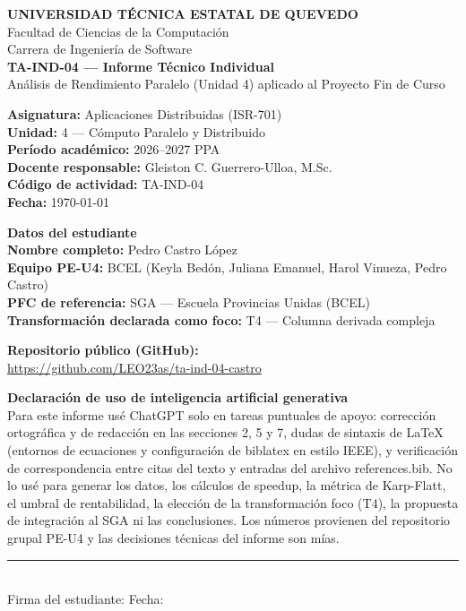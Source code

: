 \documentclass[11pt,a4paper]{article}
\begin{document}
\begin{center}
{\large\textbf{UNIVERSIDAD TÉCNICA ESTATAL DE QUEVEDO}} \\[2pt]
Facultad de Ciencias de la Computación \\
Carrera de Ingeniería de Software \\[10pt]

{\large\textbf{TA-IND-04 --- Informe Técnico Individual}} \\[4pt]
Análisis de Rendimiento Paralelo (Unidad 4) aplicado al Proyecto Fin de Curso \\[8pt]
\end{center}

\vspace{4pt}
\noindent\textbf{Asignatura:} Aplicaciones Distribuidas (ISR-701) \\
\textbf{Unidad:} 4 --- Cómputo Paralelo y Distribuido \\
\textbf{Período académico:} 2026--2027 PPA \\
\textbf{Docente responsable:} Gleiston C. Guerrero-Ulloa, M.Sc. \\
\textbf{Código de actividad:} TA-IND-04 \\
\textbf{Fecha:} \today

\vspace{10pt}
\noindent\textbf{Datos del estudiante} \\[4pt]
\textbf{Nombre completo:} Pedro Castro López \\
\textbf{Equipo PE-U4:} BCEL (Keyla Bedón, Juliana Emanuel, Harol Vinueza, Pedro Castro) \\
\textbf{PFC de referencia:} SGA --- Escuela Provincias Unidas (BCEL) \\
\textbf{Transformación declarada como foco:} T4 --- Columna derivada compleja

\vspace{10pt}
\noindent\textbf{Repositorio público (GitHub):} \\[4pt]
\url{https://github.com/LEO23as/ta-ind-04-castro}

\vspace{10pt}
\noindent\textbf{Declaración de uso de inteligencia artificial generativa} \\[4pt]
Para este informe usé ChatGPT solo en tareas puntuales de apoyo: corrección ortográfica y de redacción en las secciones 2, 5 y 7, dudas de sintaxis de LaTeX (entornos de ecuaciones y configuración de biblatex en estilo IEEE), y verificación de correspondencia entre citas del texto y entradas del archivo references.bib. No lo usé para generar los datos, los cálculos de speedup, la métrica de Karp-Flatt, el umbral de rentabilidad, la elección de la transformación foco (T4), la propuesta de integración al SGA ni las conclusiones. Los números provienen del repositorio grupal PE-U4 y las decisiones técnicas del informe son mías.

\vfill
\noindent\rule{\textwidth}{0.4pt} \\
\small Firma del estudiante: \underline{\hspace{7cm}} \quad Fecha: \underline{\hspace{3cm}}
\end{document}
